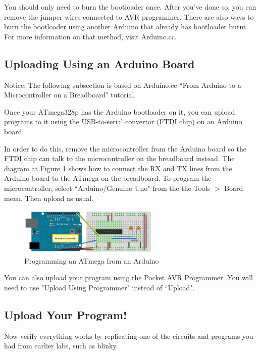 \documentclass{article}
\begin{document}
You should only need to burn the bootloader once. After you've done so, you can remove the jumper wires connected to AVR programmer. There are also ways to burn the bootloader using another Arduino that already has bootloader burnt. For more information on that method, visit Arduino.cc. 

\subsection{Uploading Using an Arduino Board}
Notice: The following subsection is based on Arduino.cc ``From Arduino to a Microcontroller on a Breadboard" tutorial. \par
Once your ATmega328p has the Arduino bootloader on it, you can upload programs to it using the USB-to-serial convertor (FTDI chip) on an Arduino board. \par In order to do this, remove the microcontroller from the Arduino board so the FTDI chip can talk to the microcontroller on the breadboard instead. The diagram at Figure \ref{img:ArduinoUSBSerial} shows how to connect the RX and TX lines from the Arduino board to the ATmega on the breadboard. To program the microcontroller, select ``Arduino/Genuino Uno" from the the Tools $>$ Board menu. Then upload as usual.

\begin{figure}[!h]
    \center
    \includegraphics[width=0.6\textwidth,keepaspectratio]{ArduinoUSBSerial}
    \caption{Programming an ATmega from an Arduino}
    \label{img:ArduinoUSBSerial}
\end{figure}

You can also upload your program using the Pocket AVR Programmer. You will need to use "Upload Using Programmer" instead of ``Upload".

\subsection{Upload Your Program!}
Now verify everything works by replicating one of the circuits and programs you had from earlier labs, such as blinky.
\end{document}
